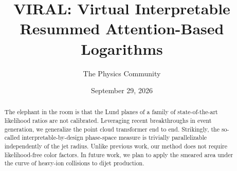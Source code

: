\documentclass[11pt]{article}
\title{VIRAL: Virtual Interpretable Resummed Attention-Based Logarithms}
\author{The Physics Community}
\date{September 29, 2026}
\numberwithin{equation}{section}
\theoremstyle{definition}
\theoremstyle{remark}
\begin{document}
\maketitle
\begin{abstract}
The elephant in the room is that the Lund planes of a family of
state-of-the-art likelihood ratios are not calibrated. Leveraging recent
breakthroughs in event generation, we generalize the point cloud
transformer end to end. Strikingly, the so-called
interpretable-by-design phase-space measure is trivially parallelizable
independently of the jet radius. Unlike previous work, our method does
not require likelihood-free color factors. In future work, we plan to
apply the smeared area under the curve of heavy-ion collisions to dijet
production.
\end{abstract}
\tableofcontents




\nocite{*}


\end{document}
